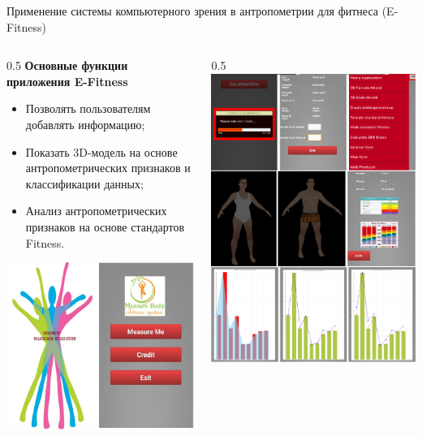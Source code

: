 \documentclass[10pt,pdf,hyperref={unicode},xcolor=table]{beamer}
\begin{document}
\begin{frame}{Применение системы компьютерного зрения в антропометрии для фитнеса (E-Fitness)}
\begin{columns}
		\begin{column} {0.5\textwidth}			
\textbf{Основные функции приложения E-Fitness}
\begin{itemize}
	\item Позволять пользователям добавлять информацию;
	\item Показать 3D-модель на основе антропометрических признаков и классификации данных;
	\item Анализ антропометрических признаков на основе стандартов Fitness.
\end{itemize}
\begin{center}
		\includegraphics[width=0.5\linewidth]{p22}
\end{center}
			\end{column}
			\begin{column} {0.5\textwidth}
\includegraphics[width=0.85\linewidth]{p21}
			\end{column}      
		\end{columns}
\end{frame}
\end{document}
